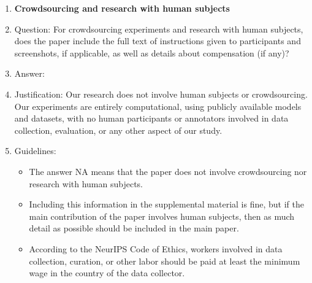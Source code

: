\documentclass{article}
\begin{document}
\begin{enumerate}
\item {\bf Crowdsourcing and research with human subjects}
    \item[] Question: For crowdsourcing experiments and research with human subjects, does the paper include the full text of instructions given to participants and screenshots, if applicable, as well as details about compensation (if any)? 
    \item[] Answer: \answerNA{} %
    \item[] Justification: Our research does not involve human subjects or crowdsourcing. Our experiments are entirely computational, using publicly available models and datasets, with no human participants or annotators involved in data collection, evaluation, or any other aspect of our study.
    \item[] Guidelines:
    \begin{itemize}
        \item The answer NA means that the paper does not involve crowdsourcing nor research with human subjects.
        \item Including this information in the supplemental material is fine, but if the main contribution of the paper involves human subjects, then as much detail as possible should be included in the main paper. 
        \item According to the NeurIPS Code of Ethics, workers involved in data collection, curation, or other labor should be paid at least the minimum wage in the country of the data collector. 
    \end{itemize}


\end{enumerate}
\end{document}
